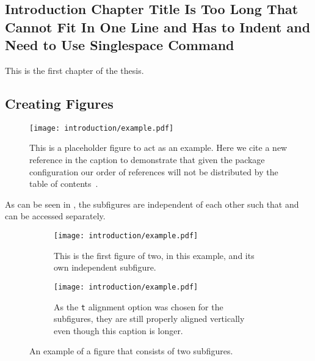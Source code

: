 \begin{singlespace}
\chapter{Introduction Chapter Title Is Too Long That Cannot Fit In One Line and Has to Indent and Need to Use Singlespace Command}\label{chapter:introduction}
\end{singlespace}

This is the first chapter of the \gls{thesis}.~\cite{Aaboud:2016mmw,Bruning:782076}

\section{Creating Figures}\label{sec:figures}
\begin{figure}[htpb]
 \centering
 \texttt{[image: introduction/example.pdf]}
 \caption[Example placeholder figure with a citation~\cite{Higgs:1964ia} and shorter List of Figures caption.
  The List of Figures is protected from first use of glossary entries or acronyms like \acrlong{LHC}.]{%
  This is a placeholder figure to act as an example.
  Here we cite a new reference in the caption to demonstrate that given the package configuration our order of references will not be distributed by the table of contents~\cite{Higgs:1964ia}.}\label{fig:test_figure}
\end{figure}

As can be seen in , the subfigures are independent of each other such that  and  can be accessed separately.

\begin{figure}[htbp]
 \centering
 \begin{subfigure}[t]{0.48\textwidth}
  \centering
  \texttt{[image: introduction/example.pdf]}
  \caption[Short List of Figures captions work with subfigures too.]{%
   This is the first figure of two, in this example, and its own independent subfigure.}
  \label{fig:subfigure_1}
 \end{subfigure}%
 \quad
 \begin{subfigure}[t]{0.48\textwidth}
  \centering
  \texttt{[image: introduction/example.pdf]}
  \caption[Which makes the List of Figures readable and actually helpful.]{%
   As the \texttt{t} alignment option was chosen for the subfigures, they are still properly aligned vertically even though this caption is longer.}
  \label{fig:subfigure_2}
 \end{subfigure}
 \caption{An example of a figure that consists of two subfigures.}
 \label{fig:subfigure_example}
\end{figure}

